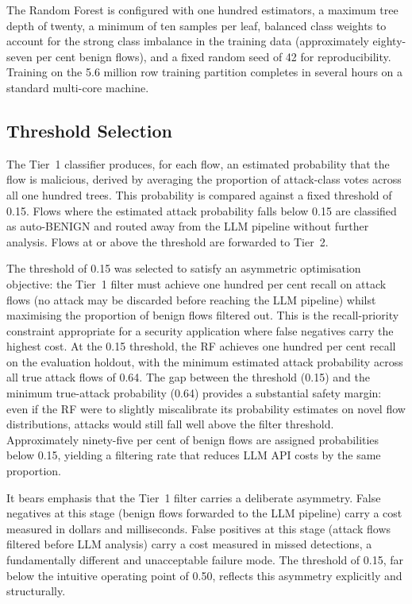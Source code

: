 \documentclass[../main.tex]{subfiles}
\begin{document}
The Random Forest is configured with one hundred estimators, a maximum tree depth of twenty, a minimum of ten samples per leaf, balanced class weights to account for the strong class imbalance in the training data (approximately eighty-seven per cent benign flows), and a fixed random seed of 42 for reproducibility. Training on the 5.6 million row training partition completes in several hours on a standard multi-core machine.

\subsection{Threshold Selection}
\label{sec:threshold-selection}

The Tier~1 classifier produces, for each flow, an estimated probability that the flow is malicious, derived by averaging the proportion of attack-class votes across all one hundred trees. This probability is compared against a fixed threshold of 0.15. Flows where the estimated attack probability falls below 0.15 are classified as auto-BENIGN and routed away from the LLM pipeline without further analysis. Flows at or above the threshold are forwarded to Tier~2.

The threshold of 0.15 was selected to satisfy an asymmetric optimisation objective: the Tier~1 filter must achieve one hundred per cent recall on attack flows (no attack may be discarded before reaching the LLM pipeline) whilst maximising the proportion of benign flows filtered out. This is the recall-priority constraint appropriate for a security application where false negatives carry the highest cost. At the 0.15 threshold, the RF achieves one hundred per cent recall on the evaluation holdout, with the minimum estimated attack probability across all true attack flows of 0.64. The gap between the threshold (0.15) and the minimum true-attack probability (0.64) provides a substantial safety margin: even if the RF were to slightly miscalibrate its probability estimates on novel flow distributions, attacks would still fall well above the filter threshold. Approximately ninety-five per cent of benign flows are assigned probabilities below 0.15, yielding a filtering rate that reduces LLM API costs by the same proportion.

It bears emphasis that the Tier~1 filter carries a deliberate asymmetry. False negatives at this stage (benign flows forwarded to the LLM pipeline) carry a cost measured in dollars and milliseconds. False positives at this stage (attack flows filtered before LLM analysis) carry a cost measured in missed detections, a fundamentally different and unacceptable failure mode. The threshold of 0.15, far below the intuitive operating point of 0.50, reflects this asymmetry explicitly and structurally.
\end{document}

